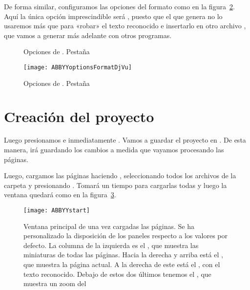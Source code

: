 \documentclass[%
	a5paper,
	10pt,
	twoside,
	openright,
	final,
]{memoir}
\begin{document}
{	De forma similar, configuramos las opciones del formato \djvu como en la figura~\ref{fig:ABBYYoptionsFormatDjVu}. Aquí la única opción imprescindible será , puesto que el \djvu que genera \abbyy no lo usaremos más que para «robar» el texto reconocido e insertarlo en otro archivo \djvu, que vamos a generar más adelante con otros programas.

	\begin{figure}
		\vspace{-20pt}
		\centering
		\caption[Opciones de \abbyy. \texttt{Format Settings >\ PDF}]{Opciones de \abbyy. Pestaña \label{fig:ABBYYoptionsFormatPDF}}
	\end{figure}

	\begin{figure}
		\texttt{[image: ABBYYoptionsFormatDjVu]}
		\caption[Opciones de \abbyy. \texttt{Format Settings >\ DjVu}]{Opciones de \abbyy. Pestaña \label{fig:ABBYYoptionsFormatDjVu}}
	\end{figure}

	\section{Creación del proyecto} Luego presionamos  e inmediatamente . Vamos a guardar el proyecto en . De esta manera, \abbyy irá guardando los cambios a medida que vayamos procesando las páginas.

	Luego, cargamos las páginas haciendo , seleccionando todos los archivos de la carpeta  y presionando . Tomará un tiempo para cargarlas todas y luego la ventana quedará como en la figura~\ref{fig:ABBYYstart}.

	\begin{figure}
		\centering
		\texttt{[image: ABBYYstart]}
		\caption[Ventana principal de \abbyy]{Ventana principal de \abbyy una vez cargadas las páginas. Se ha personalizado la disposición de los paneles respecto a los valores por defecto. La columna de la izquierda es el , que muestra las miniaturas de todas las páginas. Hacia la derecha y arriba está el , que muestra la página actual. A la derecha de este está el , con el texto reconocido. Debajo de estos dos últimos tenemos el , que muestra un zoom del \label{fig:ABBYYstart}}
	\end{figure}

}
\end{document}
